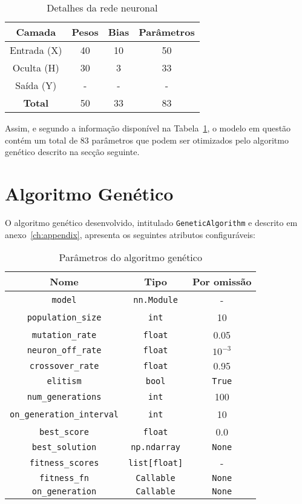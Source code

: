 \begin{table}[htpb]
    \centering
    \begin{tabular}{cccc}
        \hline
        Camada         & Pesos & Bias & Parâmetros \\ \hline
        Entrada (X)    & 40    & 10   & 50         \\
        Oculta (H)     & 30    & 3    & 33         \\
        Saída (Y)      & -     & -    & -          \\ \hline
        \textbf{Total} & 50    & 33   & 83         \\ \hline
    \end{tabular}
    \caption{Detalhes da rede neuronal}
    \label{tab:nn_summary}
\end{table}

Assim, e segundo a informação disponível na Tabela~\ref{tab:nn_summary}, o modelo em questão contém um total de 83 parâmetros que podem ser otimizados pelo algoritmo genético descrito na secção seguinte.


\section{Algoritmo Genético}\label{sec:gen_alg}

O algoritmo genético desenvolvido, intitulado \texttt{GeneticAlgorithm} e descrito em anexo~\ref{ch:appendix}, apresenta os seguintes atributos configuráveis:

\begin{table}[htbp]
    \centering
    \begin{tabular}{ccc} \hline
        \textbf{Nome} & \textbf{Tipo} & \textbf{Por omissão} \\ \hline
        \texttt{model} & \texttt{nn.Module} & - \\
        \texttt{population\_size} & \texttt{int} & 10 \\
        \texttt{mutation\_rate} & \texttt{float} & 0.05 \\
        \texttt{neuron\_off\_rate} & \texttt{float} & $10^{-3}$ \\
        \texttt{crossover\_rate} & \texttt{float} & 0.95 \\
        \texttt{elitism} & \texttt{bool} & \texttt{True} \\
        \texttt{num\_generations} & \texttt{int} & 100 \\
        \texttt{on\_generation\_interval} & \texttt{int} & 10 \\
        \texttt{best\_score} & \texttt{float} & 0.0 \\
        \texttt{best\_solution} & \texttt{np.ndarray} & \texttt{None} \\
        \texttt{fitness\_scores} & \texttt{list[float]} & - \\
        \texttt{fitness\_fn} & \texttt{Callable} & \texttt{None} \\
        \texttt{on\_generation} & \texttt{Callable} & \texttt{None} \\ \hline
    \end{tabular}
    \caption{Parâmetros do algoritmo genético}
    \label{tab:ga_params}
\end{table}

